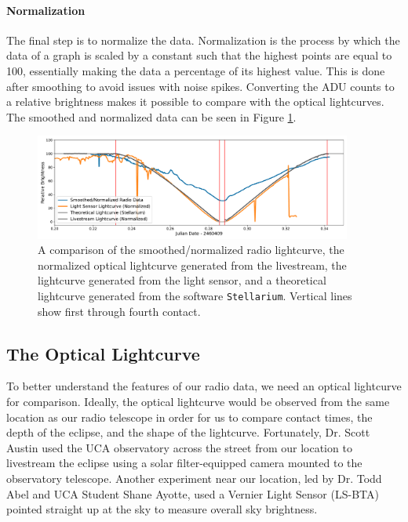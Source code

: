 \paragraph{Normalization}
The final step is to normalize the data.
Normalization is the process by which the data of a graph is scaled by a constant such that the highest points are equal to 100, essentially making the data a percentage of its highest value.
This is done after smoothing to avoid issues with noise spikes.
Converting the ADU counts to a relative brightness makes it possible to compare with the optical lightcurves.
The smoothed and normalized data can be seen in Figure \ref{fig:LightcurveComparison}.


\begin{figure}[h]
    \includegraphics[width=0.93\textwidth]{figures/LightcurveComparison.pdf}
    \caption{\label{fig:LightcurveComparison} A comparison of the smoothed/normalized radio lightcurve, the normalized optical lightcurve generated from the livestream, the lightcurve generated from the light sensor, and a theoretical lightcurve generated from the software \texttt{Stellarium}. Vertical lines show first through fourth contact. \protect}
\end{figure}



\subsection{\label{sec:optical}The Optical Lightcurve}

To better understand the features of our radio data, we need an optical lightcurve for comparison.
Ideally, the optical lightcurve would be observed from the same location as our radio telescope in order for us to compare contact times, the depth of the eclipse, and the shape of the lightcurve.
Fortunately, Dr. Scott Austin used the UCA observatory across the street from our location to livestream the eclipse using a solar filter-equipped camera mounted to the observatory telescope.
Another experiment near our location, led by Dr. Todd Abel and UCA Student Shane Ayotte, used a Vernier Light Sensor (LS-BTA) pointed straight up at the sky to measure overall sky brightness.
